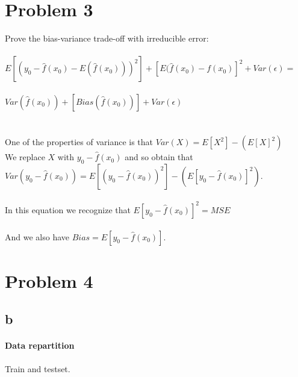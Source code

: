 \documentclass[11pt,a4paper,twoside,openright]{report}
\begin{document}
	
	
	
	\section*{Problem 3}
	
	Prove the bias-variance trade-off with irreducible error:\\\\
	
	
	
	$E[(y_{0} - \hat{f}(x_{0}) - E(\hat{f}(x_{0})))^2] + [E(\hat{f}(x_{0}) - f(x_{0})]^2 + Var(\epsilon) =$\\\\
	
	$Var(\hat{f}(x_{0})) + [Bias(\hat{f}(x_{0}))] + Var(\epsilon)$\\
	\\\\
	
	
	One of the properties of variance is that $ Var(X) = E[X^2] - (E[X]^2) $\\
	
	
	
	We replace $X$ with $y_{0} - \hat{f}(x_{0})$ and so obtain that $Var(y_{0} - \hat{f}(x_{0})) = E[(y_{0} - \hat{f}(x_{0}))^2] - (E[y_{0} - \hat{f}(x_{0})]^2)$.\\\\
	
	In this equation we recognize that $E[y_{0} - \hat{f}(x_{0})]^2 = MSE$\\\\
	
	And we also have $Bias = E[y_{0} - \hat{f}(x_{0})]$.
	
	
	
	
	
	\section*{Problem 4}
	\subsection*{b}
	
	\paragraph{Data repartition} Train and testset.\\
	
\end{document}
